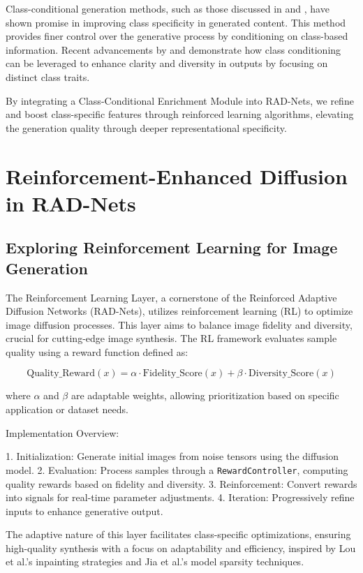 \documentclass{article} %
\begin{document}
Class-conditional generation methods, such as those discussed in \citep{brock2018large} and \citep{mirza2014conditional}, have shown promise in improving class specificity in generated content. This method provides finer control over the generative process by conditioning on class-based information. Recent advancements by \citep{karras2019style} and \citep{odena2017conditional} demonstrate how class conditioning can be leveraged to enhance clarity and diversity in outputs by focusing on distinct class traits.

By integrating a Class-Conditional Enrichment Module into RAD-Nets, we refine and boost class-specific features through reinforced learning algorithms, elevating the generation quality through deeper representational specificity.



\section{Reinforcement-Enhanced Diffusion in RAD-Nets}

\subsection{Exploring Reinforcement Learning for Image Generation}
The Reinforcement Learning Layer, a cornerstone of the Reinforced Adaptive Diffusion Networks (RAD-Nets), utilizes reinforcement learning (RL) to optimize image diffusion processes. This layer aims to balance image fidelity and diversity, crucial for cutting-edge image synthesis. The RL framework evaluates sample quality using a reward function defined as:

\[
\text{Quality\_Reward}(x) = \alpha \cdot \text{Fidelity\_Score}(x) + \beta \cdot \text{Diversity\_Score}(x)
\]

where \(\alpha\) and \(\beta\) are adaptable weights, allowing prioritization based on specific application or dataset needs.

Implementation Overview:

1. Initialization: Generate initial images from noise tensors using the diffusion model.
2. Evaluation: Process samples through a \texttt{RewardController}, computing quality rewards based on fidelity and diversity.
3. Reinforcement: Convert rewards into signals for real-time parameter adjustments.
4. Iteration: Progressively refine inputs to enhance generative output.

The adaptive nature of this layer facilitates class-specific optimizations, ensuring high-quality synthesis with a focus on adaptability and efficiency, inspired by Lou et al.'s inpainting strategies and Jia et al.'s model sparsity techniques.
\end{document}
